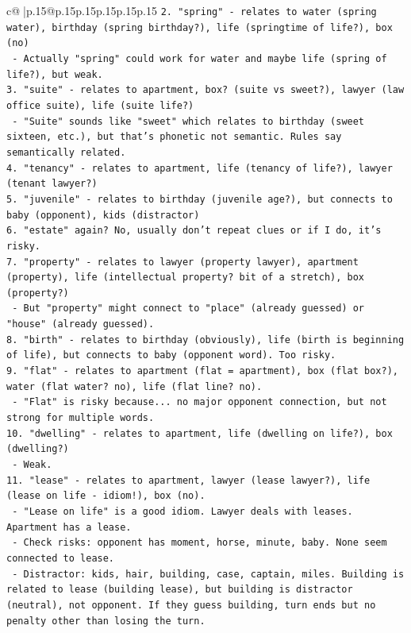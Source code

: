 \documentclass{article}
\begin{document}
{\begin{supertabular}{c@{$\;$}|p{.15\linewidth}@{}p{.15\linewidth}p{.15\linewidth}p{.15\linewidth}p{.15\linewidth}p{.15\linewidth}}
{{{\texttt{2. "spring" {-} relates to water (spring water), birthday (spring birthday?), life (springtime of life?), box (no)} \\
\texttt{   {-} Actually "spring" could work for water and maybe life (spring of life?), but weak.} \\
\texttt{3. "suite" {-} relates to apartment, box? (suite vs sweet?), lawyer (law office suite), life (suite life?)} \\
\texttt{   {-} "Suite" sounds like "sweet" which relates to birthday (sweet sixteen, etc.), but that's phonetic not semantic. Rules say semantically related.} \\
\texttt{4. "tenancy" {-} relates to apartment, life (tenancy of life?), lawyer (tenant lawyer?)} \\
\texttt{5. "juvenile" {-} relates to birthday (juvenile age?), but connects to baby (opponent), kids (distractor)} \\
\texttt{6. "estate" again? No, usually don't repeat clues or if I do, it's risky.} \\
\texttt{7. "property" {-} relates to lawyer (property lawyer), apartment (property), life (intellectual property? bit of a stretch), box (property?)} \\
\texttt{   {-} But "property" might connect to "place" (already guessed) or "house" (already guessed).} \\
\texttt{8. "birth" {-} relates to birthday (obviously), life (birth is beginning of life), but connects to baby (opponent word). Too risky.} \\
\texttt{9. "flat" {-} relates to apartment (flat = apartment), box (flat box?), water (flat water? no), life (flat line? no).} \\
\texttt{   {-} "Flat" is risky because... no major opponent connection, but not strong for multiple words.} \\
\texttt{10. "dwelling" {-} relates to apartment, life (dwelling on life?), box (dwelling?)} \\
\texttt{    {-} Weak.} \\
\texttt{11. "lease" {-} relates to apartment, lawyer (lease lawyer?), life (lease on life {-} idiom!), box (no).} \\
\texttt{    {-} "Lease on life" is a good idiom. Lawyer deals with leases. Apartment has a lease.} \\
\texttt{    {-} Check risks: opponent has moment, horse, minute, baby. None seem connected to lease.} \\
\texttt{    {-} Distractor: kids, hair, building, case, captain, miles. Building is related to lease (building lease), but building is distractor (neutral), not opponent. If they guess building, turn ends but no penalty other than losing the turn.} \\
}}}
\end{supertabular}}
\end{document}
